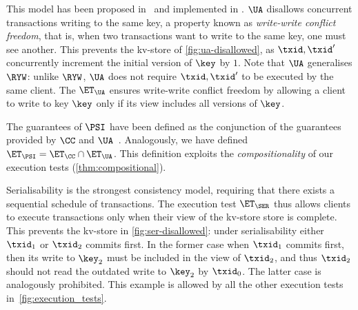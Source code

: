 This model has been proposed in~\cite{framework-concur} 
and implemented in \cite{rola}.
$\UA$ disallows concurrent transactions writing to the same key,
a property known as \emph{write-write conflict freedom}, that is, 
when two transactions want to write to the same key, one must see another.
This prevents the kv-store of \cref{fig:ua-disallowed},
as $\txid, \txid'$ concurrently increment the initial version of $\key$ by $1$.
Note that $\UA$ generalises $\RYW$: unlike $\RYW$, $\UA$ does not require $\txid, \txid'$ to be executed by the same client.
The $\ET_\UA$ ensures write-write conflict freedom by allowing a client to write to key $\key$
only if its view includes all versions of $\key$.

The guarantees of $\PSI$ have been defined as the conjunction of the guarantees provided by $\CC$ and $\UA$~\cite{framework-concur}.
Analogously, we have defined $\ET_\PSI = \ET_\CC \cap \ET_\UA$. 
This definition exploits the \emph{compositionality} of our execution tests (\cref{thm:compositional}).

Serialisability is the strongest consistency model, requiring that there exists a sequential schedule of transactions. 
The execution test $\ET_{\SER}$ thus allows clients to execute transactions only when 
their view of the kv-store store is complete.
This prevents the kv-store in  \cref{fig:ser-disallowed}: under serialisability either $\txid_1$ or $\txid_2$ commits first.
In the former case when $\txid_1$ commits first, then its write to $\key_2$ must be included in the view of $\txid_2$, and thus $\txid_2$ should not read the outdated write to $\key_2$ by $\txid_0$. 
The latter case is analogously prohibited. 
This example is allowed by all the other execution tests in~\cref{fig:execution_tests}.

